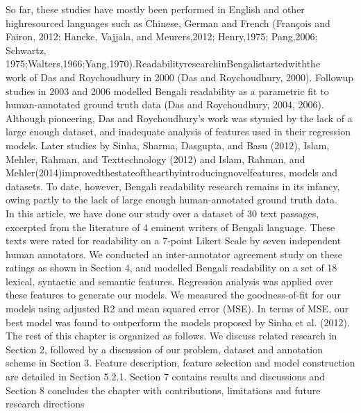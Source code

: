 \documentclass[9pt]{article}
\begin{document}
So far, these studies have mostly been performed in English and other highresourced languages such as Chinese, German and French (François and Fairon, 2012; Hancke, Vajjala, and Meurers,2012; Henry,1975; Pang,2006; Schwartz, 1975;Walters,1966;Yang,1970).ReadabilityresearchinBengalistartedwiththe \\work of Das and Roychoudhury in 2000 (Das and Roychoudhury, 2000). Followup studies in 2003 and 2006 modelled Bengali readability as a parametric ﬁt to human-annotated ground truth data (Das and Roychoudhury, 2004, 2006). Although pioneering, Das and Roychoudhury’s work was stymied by the lack of a large enough dataset, and inadequate analysis of features used in their regression models. Later studies by Sinha, Sharma, Dasgupta, and Basu (2012), Islam, Mehler, Rahman, and Texttechnology (2012) and Islam, Rahman, and Mehler(2014)improvedthestateoftheartbyintroducingnovelfeatures, models and datasets. To date, however, Bengali readability research remains in its infancy, owing partly to the lack of large enough human-annotated ground truth data.\\
In this article, we have done our study over a dataset of 30 text passages, excerpted from the literature of 4 eminent writers of Bengali language. These texts were rated for readability on a 7-point Likert Scale by seven independent human annotators. We conducted an inter-annotator agreement study on these ratings as shown in Section 4, and modelled Bengali readability on a set of 18 lexical, syntactic and semantic features. Regression analysis was applied over these features to generate our models. We measured the goodness-of-ﬁt for our models using adjusted R2 and mean squared error (MSE). In terms of MSE, our best model was found to outperform the models proposed by Sinha et al. (2012). The rest of this chapter is organized as follows. We discuss related research in Section 2, followed by a discussion of our problem, dataset and annotation scheme in Section 3. Feature description, feature selection and model construction are detailed in Section 5.2.1. Section 7 contains results and discussions and Section 8 concludes the chapter with contributions, limitations and future research directions
\end{document}
